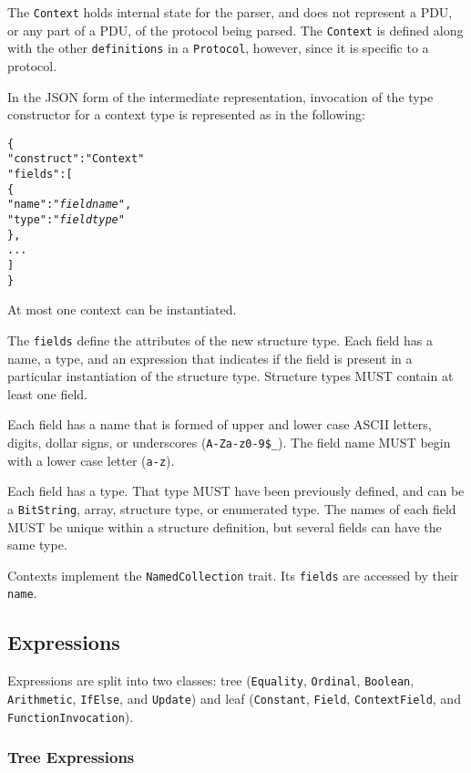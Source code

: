 \documentclass[10pt,twocolumn,a4paper]{article}
\newcommand{\code}[1]{\texttt{#1}}
\begin{document}
The \code{Context} holds internal state for the parser, and does not
represent a PDU, or any part of a PDU, of the protocol being parsed.
The \code{Context} is defined along with the other \code{definitions}
in a \code{Protocol}, however, since it is specific to a protocol.

In the JSON form of the intermediate representation, invocation of the type
constructor for a context type is represented as in the following:
\footnotesize
\begin{alltt}
  \{
    "construct"   : "Context"
    "fields"      : [
      \{
        "name"    : "\emph{field name}",
        "type"    : "\emph{field type}"
      \},
      ...
    ]
  \}
\end{alltt}
\normalsize
At most one context can be instantiated.

The \code{fields} define the attributes of the new structure type. Each
field has a name, a type, and an expression that indicates if the field is
present in a particular instantiation of the structure type. Structure
types MUST contain at least one field.

Each field has a name that is formed of upper and lower case ASCII letters,
digits, dollar signs, or underscores (\code{A-Za-z0-9\$\_}). The field name
MUST begin with a lower case letter (\code{a-z}).

Each field has a type. That type MUST have been previously defined, and can
be a \code{BitString}, array, structure type, or enumerated type. The names
of each field MUST be unique within a structure definition, but several
fields can have the same type.

Contexts implement the \code{NamedCollection} trait. Its \code{fields} are
accessed by their \code{name}.

\subsection{Expressions}
\label{sec:expressions}

Expressions are split into two classes: 
tree (\code{Equality}, \code{Ordinal}, \code{Boolean}, \code{Arithmetic}, \code{IfElse}, and
\code{Update})
and 
leaf (\code{Constant}, \code{Field}, \code{ContextField}, and \code{FunctionInvocation}).

\subsubsection{Tree Expressions}
\end{document}

